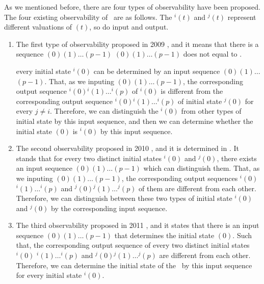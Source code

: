 As we mentioned before, there are four types of observability have been proposed. The four existing observability of \BCNs\ are as follows. The \State$^{i}(t)$ and \State$^{j}(t)$ represent different valuations of \State$(t)$, so do input and output. 
\begin{enumerate}
	\item The first type of observability proposed in 2009 \cite{cheng2009controllability}, and it means that there is a sequence \Input$(0)$\Input$(1)\ldots$\Input$(p-1)$
\Input$(0)$\Input$(1)\ldots$\Input$(p-1)$ does not equal to . 
	
	every initial state \State$^{i}(0)$ can be determined by an input sequence \Input$(0)$\Input$(1)\ldots$\Input$(p-1)$. That, as we inputing \Input$(0)$\Input$(1)\ldots$\Input$(p-1)$, the corresponding output sequence \Output$^{i}(0)$\Output$^{i}(1)\ldots$\Output$^{i}(p)$ of \State$^{i}(0)$ is different from the corresponding output sequence \Output$^{i}(0)$\Output$^{i}(1)\ldots$\Output$^{i}(p)$ of initial state \State$^{j}(0)$ for every $j\ne i$. Therefore, we can distinguish the \State$^{i}(0)$ from other types of initial state by this input sequence, and then we can determine whether the initial state \State$(0)$ is \State$^{i}(0)$ by this input sequence.
	\item 
	The second observability proposed in 2010 \cite{Zhao2010Input}, and it is determined in \cite{Li2015Controllability}. It stands that for every two distinct initial states \State$^{i}(0)$ and \State$^{j}(0)$, there exists an input sequence \Input$(0)$\Input$(1)\ldots$\Input$(p-1)$ which can distinguish them. That, as we inputing \Input$(0)$\Input$(1)\ldots$\Input$(p-1)$, the corresponding output sequences \Output$^{i}(0)$\Output$^{i}(1)\ldots$\Output$^{i}(p)$ and \Output$^{j}(0)$\Output$^{j}(1)\ldots$\Output$^{j}(p)$ of them are different from each other. Therefore, we can distinguish between these two types of initial state \State$^{i}(0)$ and \State$^{j}(0)$ by the corresponding input sequence.	
	\item The third observability proposed in 2011 \cite{Cheng2011Identification}, and it states that there is an input sequence \Input$(0)$\Input$(1)\ldots$\Input$(p-1)$ that determines the initial state \State$(0)$. Such that, the corresponding output sequence of every two distinct initial states \Output$^{i}(0)$ \Output$^{i}(1)\ldots$\Output$^{i}(p)$ and \Output$^{j}(0)$\Output$^{j}(1)\ldots$\Output$^{j}(p)$ are different from each other. Therefore, we can determine the initial state of the \BCN\ by this input sequence for every initial state \State$^{i}(0)$.
	

\end{enumerate}

